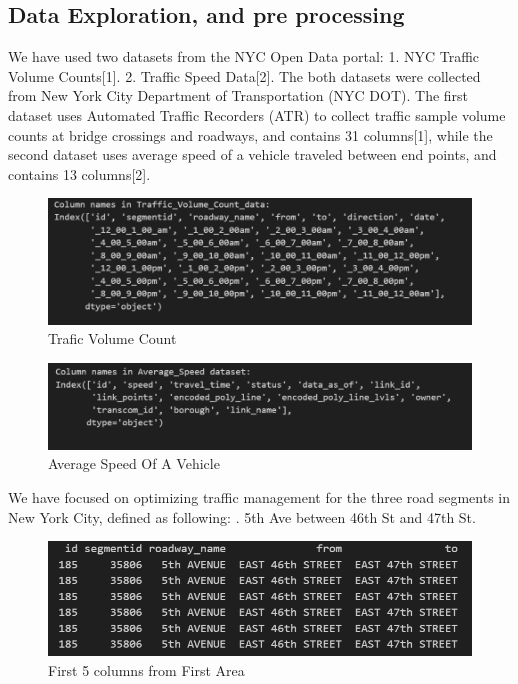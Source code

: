 \subsection{Data Exploration, and pre processing}
We have used two datasets from the NYC Open Data portal:
1. NYC Traffic Volume Counts[1].
2. Traffic Speed Data[2].
\newline
\newline
The both datasets were collected from New York City Department of Transportation (NYC DOT). The first dataset uses Automated Traffic Recorders (ATR) to collect traffic sample volume counts at bridge crossings and roadways, and contains 31 columns[1], while the second dataset uses average speed of a vehicle traveled between end points, and contains 13 columns[2].
\newline
\newline
\begin{figure}[h]
    \centering
    \includegraphics[width=1\linewidth]{figures/trafic_volume_count.PNG}
    \caption{Trafic Volume Count}
    \label{fig:Trafic Volume Count}
\end{figure}
\newline
\begin{figure}[h]
    \centering
    \includegraphics[width=1\linewidth]{figures/average_speed_dataset.PNG}
    \caption{Average Speed Of A Vehicle}
    \label{fig:Average Speed Of a Vehicle}
\end{figure}
\newline
We have focused on optimizing traffic management for the three road segments in New York City, defined as following:
. 5th Ave between 46th St and 47th St.
\newline
\begin{figure}[h]
    \centering
    \includegraphics[width=1\linewidth]{figures/area-1.PNG}
    \caption{First 5 columns from First Area}
    \label{fig:Data From Selected Area}
\end{figure}
